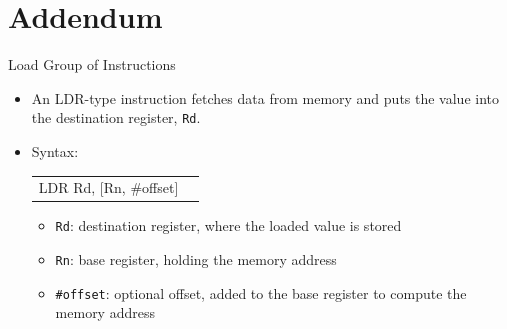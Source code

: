 \documentclass[9pt,aspectratio=169,xcolor=table]{beamer}
\begin{document}
\section{Addendum}

\def\bw{1.0}
\def\rh{0.62}
\def\regx{0.7}
\def\regy{4.3}
\def\memx{5.2}
\def\memy{3.0}

%
%
%
%

\begin{frame}{Load Group of Instructions}
	\begin{itemize}
		\item An LDR-type instruction fetches data from memory and puts
		the value into the destination register, \texttt{Rd}.
		\item Syntax: \\ %
		\begin{center}
			{\ttfamily\normalsize
				\begin{tabular}{@{}l l@{}}
					LDR  Rd, [Rn, \#offset] \\
			\end{tabular}}
			\vspace{3mm}
		\end{center}
		\begin{itemize}
			\item \texttt{Rd}: destination register, where the loaded value is stored
			\item \texttt{Rn}: base register, holding the memory address
			\item \texttt{\#offset}: optional offset, added to the base register to compute the memory address
		\end{itemize}
	\end{itemize}
\end{frame}
\end{document}
